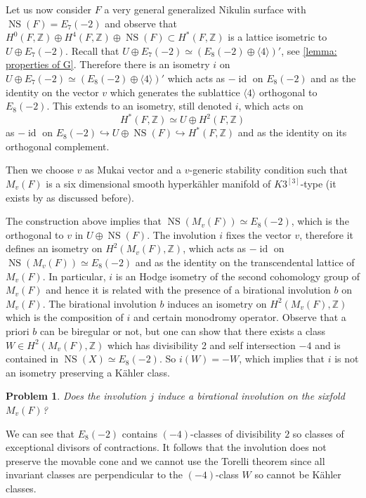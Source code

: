 \documentclass{amsart}
\newtheorem{prob}[thm]{Problem}
\theoremstyle{definition}
\numberwithin{equation}{section}
\numberwithin{equation}{section} \theoremstyle{definition}
\DeclareMathOperator{\NS}{NS}
\DeclareMathOperator{\id}{id}
\newcommand\Z{\mathbb{Z}}
\begin{document}
Let us now consider $F$ a very general generalized Nikulin surface with $\NS(F)=E_7(-2)$ and observe that $H^0(F,\Z)\oplus H^4(F,\Z)\oplus \NS(F)\subset H^*(F,\Z)$ is a lattice isometric to $U\oplus E_7(-2)$. Recall that 
$U\oplus E_7(-2) \simeq (E_8(-2)\oplus \langle4\rangle)'$, see \ref{lemma: properties of G}. Therefore there is an isometry $i$ on $U\oplus E_7(-2)\simeq (E_8(-2)\oplus \langle4\rangle)'$ which acts as $-\id$ on $E_8(-2)$ and as the identity on the vector $v$ which generates the sublattice $\langle 4\rangle$ orthogonal to $E_8(-2)$.
This extends to an isometry, still denoted $i$, which  acts on $$H^*(F,\Z)\simeq U\oplus H^2(F,\Z)$$ as $-\id$ on $E_8(-2)\hookrightarrow U\oplus \NS(F)\hookrightarrow H^*(F,\Z)$ and as the identity on its orthogonal complement. 

Then we choose $v$ as Mukai vector and a $v$-generic stability condition such that $M_v(F)$ is a six dimensional smooth hyperk\"ahler manifold of $K3^{[3]}$-type (it exists by \cite{BM} as discussed before). 

The construction above implies that $\NS(M_v(F))\simeq E_8(-2)$, which is the orthogonal to $v$ in $U\oplus \NS(F)$.
The involution $i$ fixes the vector $v$, therefore it defines an isometry on $H^2(M_v(F),\Z)$, which acts as $-\id$ on $\NS(M_v(F))\simeq E_8(-2)$ and as the identity on the transcendental lattice of $M_v(F)$.
In particular, $i$ is an Hodge isometry of the second cohomology group of $M_v(F)$ and hence it is related with the presence of a birational involution $b$ on $M_v(F)$. The birational involution $b$ induces an isometry on $H^2(M_v(F),\Z)$ which is the composition of $i$ and certain monodromy operator. Observe that a priori $b$ can be biregular or not, but one can show that there exists a class $W\in H^2(M_v(F),\Z)$ which has divisibility 2 and self intersection $-4$ and is contained in $\NS(X)\simeq E_8(-2)$. So $i(W)=-W$, which implies that $i$ is not an isometry preserving a K\"ahler class. 

\begin{prob}
    Does the involution $j$ induce a birational involution
    on the sixfold $M_v(F)$? 
\end{prob}

 We can see that $E_8(-2)$ contains $(-4)$-classes of divisibility $2$ so classes of exceptional divisors of  contractions.
 It follows that the involution does not preserve the movable cone and we cannot use the Torelli theorem \cite{BL,MenetTorelli} since all invariant classes are perpendicular to the $(-4)$-class $W$ so cannot be K\"ahler classes.
\end{document}
